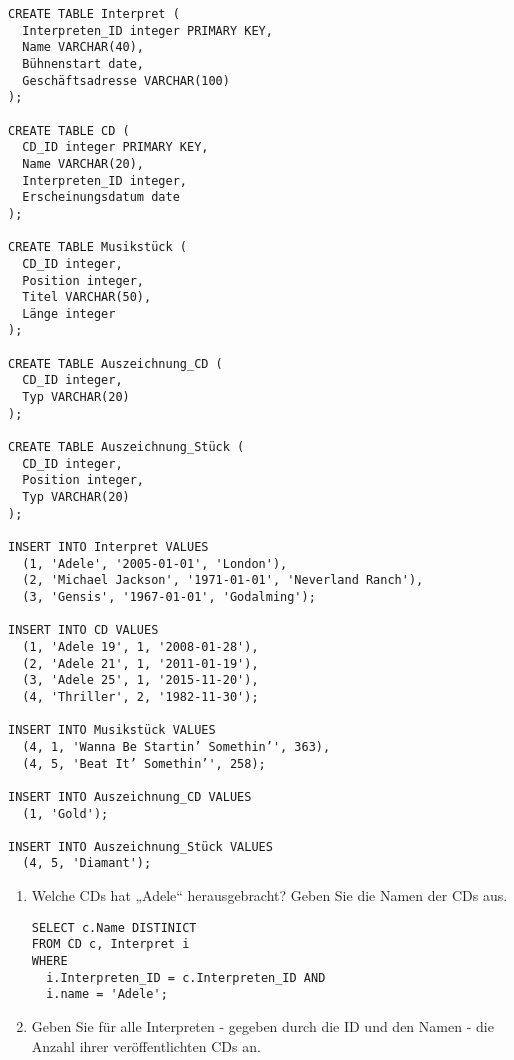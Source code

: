 \documentclass{bschlangaul-aufgabe}
\begin{document}
\begin{bAdditum}[Übungsdatenbank]
\begin{verbatim}
CREATE TABLE Interpret (
  Interpreten_ID integer PRIMARY KEY,
  Name VARCHAR(40),
  Bühnenstart date,
  Geschäftsadresse VARCHAR(100)
);

CREATE TABLE CD (
  CD_ID integer PRIMARY KEY,
  Name VARCHAR(20),
  Interpreten_ID integer,
  Erscheinungsdatum date
);

CREATE TABLE Musikstück (
  CD_ID integer,
  Position integer,
  Titel VARCHAR(50),
  Länge integer
);

CREATE TABLE Auszeichnung_CD (
  CD_ID integer,
  Typ VARCHAR(20)
);

CREATE TABLE Auszeichnung_Stück (
  CD_ID integer,
  Position integer,
  Typ VARCHAR(20)
);

INSERT INTO Interpret VALUES
  (1, 'Adele', '2005-01-01', 'London'),
  (2, 'Michael Jackson', '1971-01-01', 'Neverland Ranch'),
  (3, 'Gensis', '1967-01-01', 'Godalming');

INSERT INTO CD VALUES
  (1, 'Adele 19', 1, '2008-01-28'),
  (2, 'Adele 21', 1, '2011-01-19'),
  (3, 'Adele 25', 1, '2015-11-20'),
  (4, 'Thriller', 2, '1982-11-30');

INSERT INTO Musikstück VALUES
  (4, 1, 'Wanna Be Startin’ Somethin’', 363),
  (4, 5, 'Beat It’ Somethin’', 258);

INSERT INTO Auszeichnung_CD VALUES
  (1, 'Gold');

INSERT INTO Auszeichnung_Stück VALUES
  (4, 5, 'Diamant');
\end{verbatim}

\end{bAdditum}\begin{enumerate}


\item Welche CDs hat „Adele“ herausgebracht? Geben Sie die Namen der CDs
aus.

\begin{bAntwort}
\begin{verbatim}
SELECT c.Name DISTINICT
FROM CD c, Interpret i
WHERE
  i.Interpreten_ID = c.Interpreten_ID AND
  i.name = 'Adele';
\end{verbatim}
\end{bAntwort}


\item Geben Sie für alle Interpreten - gegeben durch die ID und den
Namen - die Anzahl ihrer veröffentlichten CDs an.


\end{enumerate}
\end{document}
